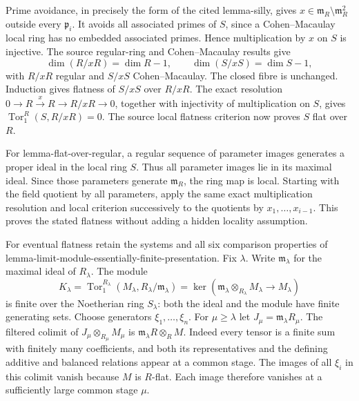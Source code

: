 Prime avoidance, in precisely the form of the cited lemma-silly, gives \(x\in\mathfrak m_R\setminus\mathfrak m_R^2\) outside every \(\mathfrak p_i\). It avoids all associated primes of \(S\), since a Cohen--Macaulay local ring has no embedded associated primes. Hence multiplication by \(x\) on \(S\) is injective. The source regular-ring and Cohen--Macaulay results give \[
\dim(R/xR)=\dim R-1,\qquad
\dim(S/xS)=\dim S-1,
\] with \(R/xR\) regular and \(S/xS\) Cohen--Macaulay. The closed fibre is unchanged. Induction gives flatness of \(S/xS\) over \(R/xR\). The exact resolution \(0\to R\xrightarrow{x}R\to R/xR\to0\), together with injectivity of multiplication on \(S\), gives \(\operatorname{Tor}_1^R(S,R/xR)=0\). The source local flatness criterion now proves \(S\) flat over \(R\).

For lemma-\AlgebraIdentifierBreak{}flat-\AlgebraIdentifierBreak{}over-\AlgebraIdentifierBreak{}regular, a regular sequence of parameter images generates a proper ideal in the local ring \(S\). Thus all parameter images lie in its maximal ideal. Since those parameters generate \(\mathfrak m_R\), the ring map is local. Starting with the field quotient by all parameters, apply the same exact multiplication resolution and local criterion successively to the quotients by \(x_1,\ldots,x_{i-1}\). This proves the stated flatness without adding a hidden locality assumption.

For eventual flatness retain the systems and all six comparison properties of lemma-\AlgebraIdentifierBreak{}limit-\AlgebraIdentifierBreak{}module-\AlgebraIdentifierBreak{}essentially-\AlgebraIdentifierBreak{}finite-\AlgebraIdentifierBreak{}presentation. Fix \(\lambda\). Write \(\mathfrak m_\lambda\) for the maximal ideal of \(R_\lambda\). The module \[
K_\lambda=\operatorname{Tor}_1^{R_\lambda}
 (M_\lambda,R_\lambda/\mathfrak m_\lambda)
 =\ker(\mathfrak m_\lambda\otimes_{R_\lambda}M_\lambda\longrightarrow M_\lambda)
\] is finite over the Noetherian ring \(S_\lambda\): both the ideal and the module have finite generating sets. Choose generators \(\xi_1,\ldots,\xi_n\). For \(\mu\geq\lambda\) let \(J_\mu=\mathfrak m_\lambda R_\mu\). The filtered colimit of \(J_\mu\otimes_{R_\mu}M_\mu\) is \(\mathfrak m_\lambda R\otimes_R M\). Indeed every tensor is a finite sum with finitely many coefficients, and both its representatives and the defining additive and balanced relations appear at a common stage. The images of all \(\xi_i\) in this colimit vanish because \(M\) is \(R\)-flat. Each image therefore vanishes at a sufficiently large common stage \(\mu\).

